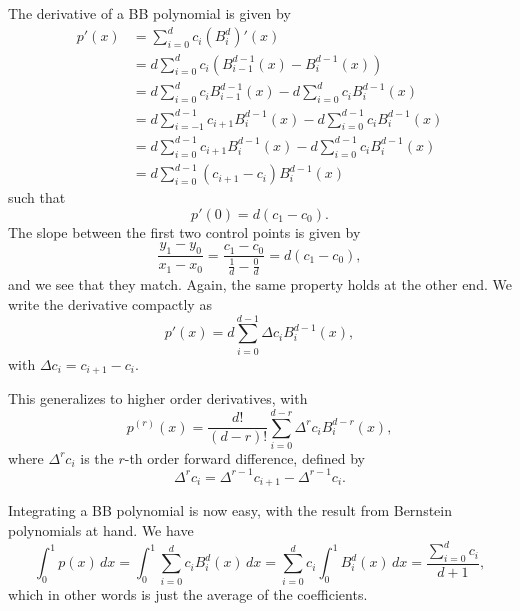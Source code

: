 The derivative of a BB polynomial is given by
\begin{align*}
    p'(x)
    &= \sum_{i = 0}^d c_i (B_i^d)'(x) \\
    &= d \sum_{i = 0}^d c_i (B_{i - 1}^{d - 1}(x) - B_{i}^{d - 1}(x)) \\
    &= d \sum_{i = 0}^d c_i B_{i - 1}^{d - 1}(x) - d \sum_{i = 0}^d c_i B_{i}^{d - 1}(x) \\
    &= d \sum_{i = -1}^{d-1} c_{i+1} B_{i}^{d - 1}(x) - d \sum_{i = 0}^{d - 1} c_i B_{i}^{d - 1}(x) \\
    &= d \sum_{i = 0}^{d-1} c_{i+1} B_{i}^{d - 1}(x) - d \sum_{i = 0}^{d - 1} c_i B_{i}^{d - 1}(x) \\
    &= d \sum_{i = 0}^{d-1} (c_{i+1} - c_i) B_{i}^{d - 1}(x)
\end{align*}
such that
\begin{equation}
    p'(0) = d (c_1 - c_0).
\end{equation}
The slope between the first two control points is given by
\begin{equation}
    \frac{y_1 - y_0}{x_1 - x_0} = \frac{c_1 - c_0}{\frac{1}{d} - \frac{0}{d}} = d(c_1 - c_0),
\end{equation}
and we see that they match.
Again, the same property holds at the other end.
We write the derivative compactly as
\begin{equation}
    p'(x) = d \sum_{i = 0}^{d-1} \Delta c_i B_{i}^{d - 1}(x),
\end{equation}
with $\Delta c_i = c_{i+1} - c_i$.

This generalizes to higher order derivatives, with
\begin{equation}
    p^{(r)}(x) = \frac{d!}{(d - r)!} \sum_{i = 0}^{d - r} \Delta^r c_i B_i^{d-r}(x),
\end{equation}
where $\Delta^r c_i$ is the $r$-th order forward difference, defined by
\begin{equation}
    \Delta^r c_i = \Delta^{r - 1} c_{i + 1} - \Delta^{r-1} c_i.
\end{equation}

Integrating a BB polynomial is now easy, with the result from Bernstein polynomials at hand.
We have
\begin{equation}
    \int_{0}^{1} p(x) \, dx
    = \int_{0}^{1} \sum_{i = 0}^{d} c_i B_i^d(x) \, dx
    = \sum_{i = 0}^{d} c_i \int_{0}^{1} B_i^d(x) \, dx
    = \frac{\sum_{i = 0}^{d} c_i}{d + 1},
\end{equation}
which in other words is just the average of the coefficients.

